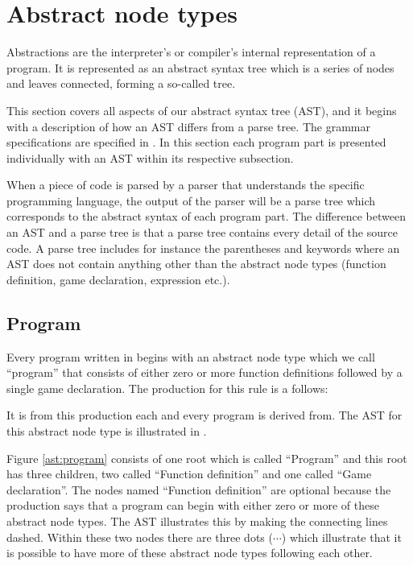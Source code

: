 \section{Abstract node types}
\label{sec:ant}


Abstractions are the interpreter's or compiler's internal representation of a program. It is represented as an abstract syntax tree which is a series of nodes and leaves connected, forming a so-called tree.%

This section covers all aspects of our abstract syntax tree (AST), and it begins with a description of how an AST differs from a parse tree. 
The grammar specifications are specified in . In this section each program part is presented individually with an AST within its respective subsection.%

When a piece of code is parsed by a parser that understands the specific programming language, the output of the parser will be a parse tree which corresponds to the abstract syntax of each program part. The difference between an AST and a parse tree is that a parse tree contains every detail of the source code. A parse tree includes for instance the parentheses and keywords where an AST does not contain anything other than the abstract node types (function definition, game declaration, expression etc.).%

\subsection{Program}%
Every program written in \productname{} begins with an abstract node type which we call ``program'' that consists of either zero or more function definitions followed by a single game declaration. The production for this rule is a follows:%

\begin{ebnf}%
%
\end{ebnf}%

It is from this production each and every program is derived from. The AST for this abstract node type is illustrated in .%

%

Figure \ref{ast:program} consists of one root which is called ``Program'' and this root has three children, two called ``Function definition'' and one called ``Game declaration''. The nodes named ``Function definition'' are optional because the production says that a program can begin with either zero or more of these abstract node types. The AST illustrates this by making the connecting lines dashed. Within these two nodes there are three dots ($\cdots$) which illustrate that it is possible to have more of these abstract node types following each other.%


